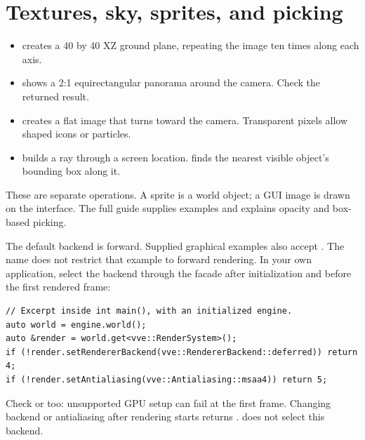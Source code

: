 \documentclass[11pt,a4paper]{article}
\begin{document}
\section{Textures, sky, sprites, and picking}
\begin{itemize}
\item {} creates a 40 by 40 XZ ground plane, repeating the image ten times along each axis.
\item {} shows a 2:1 equirectangular panorama around the camera. Check the returned result.
\item {} creates a flat image that turns toward the camera. Transparent pixels allow shaped icons or particles.
\item {} builds a ray through a screen location.  finds the nearest visible object's bounding box along it.
\end{itemize}
These are separate operations. A sprite is a world object; a GUI image is drawn on the interface. The full guide supplies examples and explains opacity and box-based picking.

The default backend is forward. Supplied graphical examples also accept . The name  does not restrict that example to forward rendering. In your own application, select the backend through the facade after initialization and before the first rendered frame:
\begin{lstlisting}
// Excerpt inside int main(), with an initialized engine.
auto world = engine.world();
auto &render = world.get<vve::RenderSystem>();
if (!render.setRendererBackend(vve::RendererBackend::deferred)) return 4;
if (!render.setAntialiasing(vve::Antialiasing::msaa4)) return 5;
\end{lstlisting}
Check  or  too: unsupported GPU setup can fail at the first frame. Changing backend or antialiasing after rendering starts returns .  does not select this backend.
\end{document}
